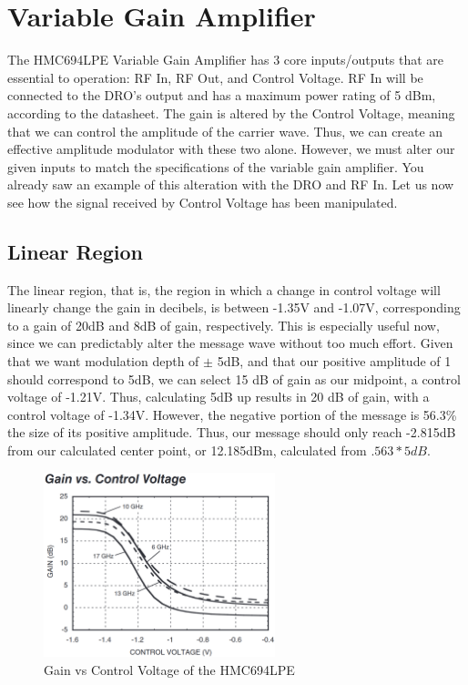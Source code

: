 \section{Variable Gain Amplifier}
The HMC694LPE Variable Gain Amplifier has 3 core inputs/outputs that are essential to operation: RF In, RF Out, and Control Voltage. RF In will be connected to the DRO's output and has a maximum power rating of 5 dBm, according to the datasheet. The gain is altered by the Control Voltage, meaning that we can control the amplitude of the carrier wave. Thus, we can create an effective amplitude modulator with these two alone. However, we must alter our given inputs to match the specifications of the variable gain amplifier. You already saw an example of this alteration with the DRO and RF In. Let us now see how the signal received by Control Voltage has been manipulated.

\subsection{Linear Region}\label{VGA Linear}
The linear region, that is, the region in which a change in control voltage will linearly change the gain in decibels, is between -1.35V and -1.07V, corresponding to a gain of 20dB and 8dB of gain, respectively. This is especially useful now, since we can predictably alter the message wave without too much effort. Given that we want modulation depth of $\pm$ 5dB, and that our positive amplitude of 1 should correspond to 5dB, we can select 15 dB of gain as our midpoint, a control voltage of -1.21V. Thus, calculating 5dB up results in 20 dB of gain, with a control voltage of -1.34V. However, the negative portion of the message is 56.3\% the size of its positive amplitude. Thus, our message should only reach -2.815dB from our calculated center point, or 12.185dBm, calculated from \(.563 * 5dB.\)

\begin{figure}[H]
    \centering
    \includegraphics[width = 0.6\textwidth]{Images/Sub-figures_Example/Gain v Control Voltage.png}
    \caption{Gain vs Control Voltage of the HMC694LPE}
    \label{fig:my_label}
\end{figure}